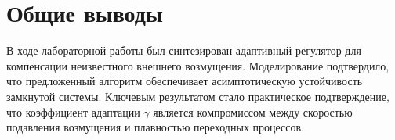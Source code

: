 \documentclass[a4paper,hidelinks,14pt]{extarticle}
\begin{document}
	\section{Общие выводы}
	В ходе лабораторной работы был синтезирован адаптивный регулятор для компенсации неизвестного внешнего возмущения. Моделирование подтвердило, что предложенный алгоритм обеспечивает асимптотическую устойчивость замкнутой системы. Ключевым результатом стало практическое подтверждение, что коэффициент адаптации $\gamma$ является компромиссом между скоростью подавления возмущения и плавностью переходных процессов.






	
\end{document}

